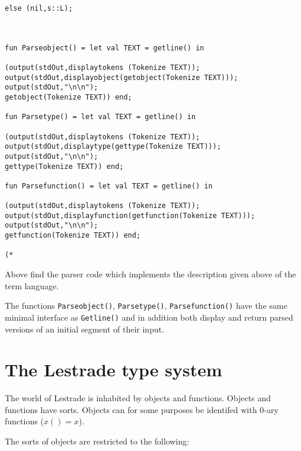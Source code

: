 \documentclass[12pt]{article}
\begin{document}
\begin{verbatim}
else (nil,s::L);



fun Parseobject() = let val TEXT = getline() in

(output(stdOut,displaytokens (Tokenize TEXT));
output(stdOut,displayobject(getobject(Tokenize TEXT)));
output(stdOut,"\n\n");
getobject(Tokenize TEXT)) end;

fun Parsetype() = let val TEXT = getline() in

(output(stdOut,displaytokens (Tokenize TEXT));
output(stdOut,displaytype(gettype(Tokenize TEXT)));
output(stdOut,"\n\n");
gettype(Tokenize TEXT)) end;

fun Parsefunction() = let val TEXT = getline() in

(output(stdOut,displaytokens (Tokenize TEXT));
output(stdOut,displayfunction(getfunction(Tokenize TEXT)));
output(stdOut,"\n\n");
getfunction(Tokenize TEXT)) end;

(*

\end{verbatim}

Above find the parser code which implements the description given above of the term language.

The functions {\tt Parseobject()}, {\tt Parsetype()}, {\tt Parsefunction()} have the same minimal interface as {\tt Getline()} and in addition both display and return parsed versions of an initial segment of their input.





\newpage



\section{The Lestrade type system}

The world of Lestrade is inhabited by objects and functions.  Objects and functions have sorts.  Objects can for some purposes be identifed with 0-ary functions ($x() = x$).

The sorts of objects are restricted to the following:
\end{document}
